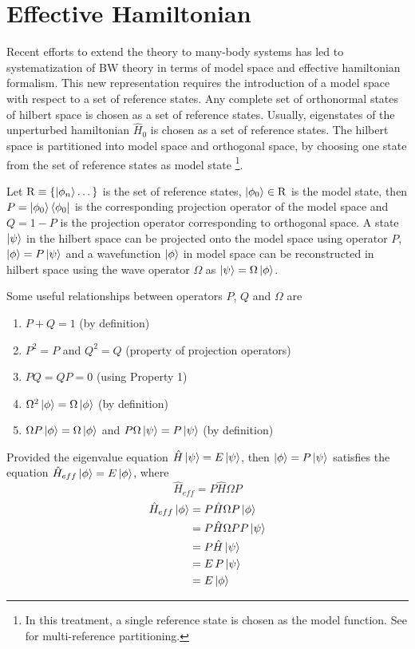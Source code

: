 \section{Effective Hamiltonian}
Recent efforts to extend the theory to many-body systems has led to systematization of BW theory in 
terms of model space and effective hamiltonian formalism. This new representation requires the
introduction of a model space with respect to a set of reference states. Any complete set of orthonormal states of hilbert space 
is chosen as a set of reference states. Usually, eigenstates of the unperturbed hamiltonian $\hat{H}_{0}$ is chosen as a set of 
reference states. The hilbert space is partitioned into model space and orthogonal space, by choosing one state from the set of
reference states as model state \footnote{In this treatment, a single reference state is chosen as the model function. See 
\cite{wilson2009brillouin} for multi-reference partitioning.}.

Let $\mathrm{R}\equiv\{\ket{\phi_n}\dots\}$ is the set of reference states, $\ket{\phi_0} \in \mathrm{R}$ is the model state, 
then $P = \ket{\phi_0}\bra{\phi_0}$ is the corresponding projection operator of the model space and $Q = \mathrm{1} - P$ is the
projection operator corresponding to orthogonal space. A state $\ket{\psi}$ in the hilbert space can be projected onto the model 
space using operator $P$, $\ket{\phi} = P\ket{\psi}$ and a wavefunction $\ket{\phi}$ in model space can be reconstructed in hilbert
space using the wave operator $\Omega$ as $\ket{\psi} = \Omega\ket{\phi}$.

Some useful relationships between operators $P$, $Q$ and $\Omega$ are 
\begin{enumerate}
 \item $P + Q = \mathrm{1}$ (by definition)
 \item $P^2 = P$ and $Q^2 = Q$ (property of projection operators)
 \item $PQ = QP = 0$ (using Property 1)
 \item $\Omega^2\ket{\phi} = \Omega\ket{\phi}$ (by definition)
 \item $\Omega P \ket{\phi} = \Omega \ket{\phi}$ and $P\Omega \ket{\psi} = P \ket{\psi}$ (by definition)
\end{enumerate}

Provided the eigenvalue equation
$\hat{H}\ket{\psi} = E\ket{\psi}$, then $\ket{\phi} = P\ket{\psi}$ satisfies the equation 
$\hat{H}_{eff}\ket{\phi} = E\ket{\phi}$, where 
\begin{equation}
  \hat{H}_{eff} = P\hat{H}\Omega P
\end{equation}
\begin{align*}
 \hat{H}_{eff}\ket{\phi} &= P\hat{H}\Omega P \ket{\phi} \\
 &= P\hat{H}\Omega P P\ket{\psi} \\
 &= P\hat{H}\ket{\psi} \\
 &= E\,P\ket{\psi} \\
 &= E\ket{\phi}
\end{align*}

